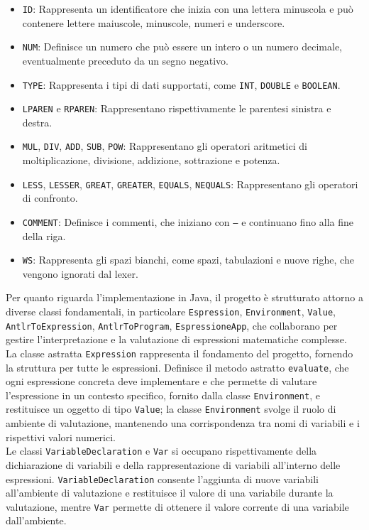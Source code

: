 \documentclass{article}
\begin{document}
\begin{itemize}
    \item \texttt{ID}: Rappresenta un identificatore che inizia con una lettera minuscola e può contenere lettere maiuscole, minuscole, numeri e underscore.
    \item \texttt{NUM}: Definisce un numero che può essere un intero o un numero decimale, eventualmente preceduto da un segno negativo.
    \item \texttt{TYPE}: Rappresenta i tipi di dati supportati, come \texttt{INT}, \texttt{DOUBLE} e \texttt{BOOLEAN}.
    \item \texttt{LPAREN} e \texttt{RPAREN}: Rappresentano rispettivamente le parentesi sinistra e destra.
    \item \texttt{MUL}, \texttt{DIV}, \texttt{ADD}, \texttt{SUB}, \texttt{POW}: Rappresentano gli operatori aritmetici di moltiplicazione, divisione, addizione, sottrazione e potenza.
    \item \texttt{LESS}, \texttt{LESSER}, \texttt{GREAT}, \texttt{GREATER}, \texttt{EQUALS}, \texttt{NEQUALS}: Rappresentano gli operatori di confronto.
    \item \texttt{COMMENT}: Definisce i commenti, che iniziano con \texttt{--} e continuano fino alla fine della riga.
    \item \texttt{WS}: Rappresenta gli spazi bianchi, come spazi, tabulazioni e nuove righe, che vengono ignorati dal lexer.
\end{itemize}
Per quanto riguarda l'implementazione in Java, il progetto è strutturato attorno a diverse classi fondamentali, in particolare \texttt{Espression}, \texttt{Environment}, \texttt{Value}, \texttt{AntlrToExpression}, \texttt{AntlrToProgram}, \texttt{EspressioneApp}, che collaborano per gestire l'interpretazione e la valutazione di espressioni matematiche complesse.
\\\noindent
La classe astratta \texttt{Expression} rappresenta il fondamento del progetto, fornendo la struttura per tutte le espressioni. Definisce il metodo astratto \texttt{evaluate}, che ogni espressione concreta deve implementare e che permette di valutare l'espressione in un contesto specifico, fornito dalla classe \texttt{Environment}, e restituisce un oggetto di tipo \texttt{Value}; la classe \texttt{Environment} svolge il ruolo di ambiente di valutazione, mantenendo una corrispondenza tra nomi di variabili e i rispettivi valori numerici. 
\\\noindent
Le classi \texttt{VariableDeclaration} e \texttt{Var} si occupano rispettivamente della dichiarazione di variabili e della rappresentazione di variabili all'interno delle espressioni. \texttt{VariableDeclaration} consente l'aggiunta di nuove variabili all'ambiente di valutazione e restituisce il valore di una variabile durante la valutazione, mentre \texttt{Var} permette di ottenere il valore corrente di una variabile dall'ambiente.
\end{document}

